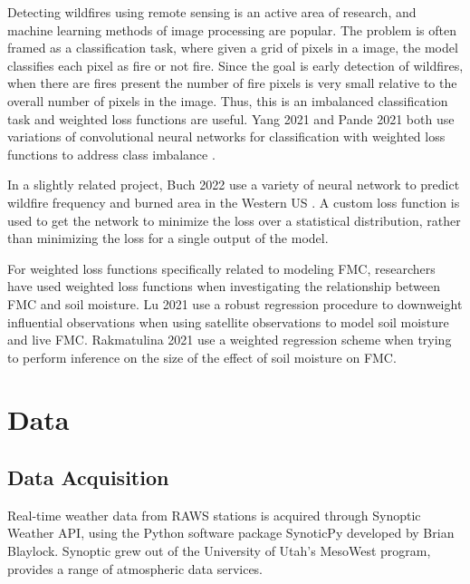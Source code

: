 \documentclass[11pt]{article}%
\begin{document}
Detecting wildfires using remote sensing is an active area of research, and machine learning methods of image processing are popular. The problem is often framed as a classification task, where given a grid of pixels in a image, the model classifies each pixel as fire or not fire. Since the goal is early detection of wildfires, when there are fires present the number of fire pixels is very small relative to the overall number of pixels in the image. Thus, this is an imbalanced classification task and weighted loss functions are useful. Yang 2021 and Pande 2021 both use variations of convolutional neural networks for classification with weighted loss functions to address class imbalance \cite{Yang-2021-PFF}\cite{Pande-2021-WSF}.

In a slightly related project, Buch 2022 use a variety of neural network to predict wildfire frequency and burned area in the Western US \cite{Buch-2022-SML}. A custom loss function is used to get the network to minimize the loss over a statistical distribution, rather than minimizing the loss for a single output of the model.

For weighted loss functions specifically related to modeling FMC, researchers have used weighted loss functions when investigating the relationship between FMC and soil moisture. Lu 2021 use a robust regression procedure to downweight influential observations when using satellite observations to model soil moisture and live FMC. \cite{Lu-2021-EMS} Rakmatulina 2021 use a weighted regression scheme when trying to perform inference on the size of the effect of soil moisture on FMC. \cite{Rakhmatulina-2021-SMI}


\section{Data}
\subsection{Data Acquisition}

Real-time weather data from RAWS stations is acquired through Synoptic Weather API, using the Python software package SynoticPy developed by Brian Blaylock. \cite{Synoptic-2024-SWA, Blaylock-2023-SPA} Synoptic grew out of the University of Utah's MesoWest program, provides a range of atmospheric data services.
\end{document}

